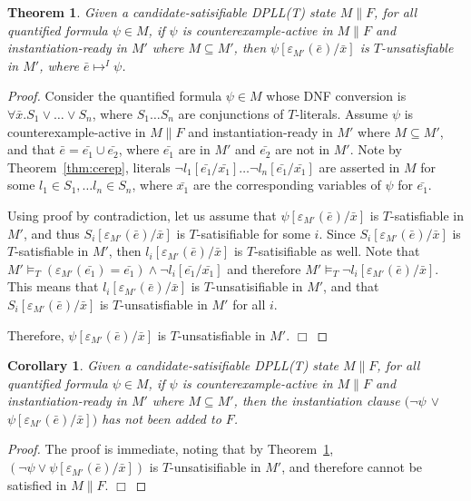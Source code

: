 \documentclass{llncs}
\newtheorem{thm}{Theorem}
\newtheorem{cor}{Corollary}
\begin{document}
\begin{thm}
\label{thm:instready}
Given a candidate-satisifiable DPLL(T) state $M \parallel F$, for all quantified formula $\psi \in M$, if $\psi$ is counterexample-active in $M \parallel F$ and instantiation-ready in $M'$ where $M \subseteq M'$, then $\psi[\varepsilon_{M'}( \bar{e} )/\bar{x}]$ is $T$-unsatisfiable in $M'$, where $\bar{e} \mapsto^I \psi$.
\end{thm}
\begin{proof}
Consider the quantified formula $\psi \in M$ whose DNF conversion is $\forall \bar{x}. S_1 \vee \ldots \vee S_n$, where $S_1 \ldots S_n$ are conjunctions of $T$-literals.
Assume $\psi$ is counterexample-active in $M \parallel F$ and instantiation-ready in $M'$ where $M \subseteq M'$, and that $\bar{e} = \bar{e_1} \cup \bar{e_2}$, where $\bar{e_1}$ are in $M'$ and $\bar{e_2}$ are not in $M'$.
Note by Theorem~\ref{thm:cerep}, literals $\neg l_1 [\bar{e_1}/\bar{x_1}] \ldots \neg l_n [ \bar{e_1}/\bar{x_1} ]$ are asserted in $M$ for some $l_1 \in S_1, \ldots l_n \in S_n$, where $\bar{x_1}$ are the corresponding variables of $\psi$ for $\bar{e_1}$.

Using proof by contradiction, let us assume that $\psi[\varepsilon_{M'}( \bar{e} )/\bar{x}]$ is $T$-satisfiable in $M'$, and thus $S_i[\varepsilon_{M'}( \bar{e} )/\bar{x}]$ is $T$-satisifiable for some $i$.
Since $S_i[\varepsilon_{M'}(\bar{e})/\bar{x}]$ is $T$-satisfiable in $M'$, then $l_i[\varepsilon_{M'}( \bar{e} )/\bar{x}]$ is $T$-satisifiable as well.
Note that $M' \models_T (\varepsilon_{M'}(\bar{e_1}) = \bar{e_1}) \wedge \neg l_i[\bar{e_1}/\bar{x_1}]$ and therefore $M' \models_T \neg l_i[\varepsilon_{M'}(\bar{e})/\bar{x}]$.
This means that $l_i[\varepsilon_{M'}(\bar{e})/\bar{x}]$ is $T$-unsatisifiable in $M'$, and that $S_i[\varepsilon_{M'}(\bar{e})/\bar{x}]$ is $T$-unsatisfiable in $M'$ for all $i$.

Therefore, $\psi[\varepsilon_{M'}( \bar{e} )/\bar{x}]$ is $T$-unsatisfiable in $M'$. $\Box$
\end{proof}

\begin{cor}
\label{cor:instready}
Given a candidate-satisifiable DPLL(T) state $M \parallel F$, for all quantified formula $\psi \in M$,
if $\psi$ is counterexample-active in $M \parallel F$ and instantiation-ready in $M'$ where $M \subseteq M'$, then the instantiation clause $( \neg \psi$ $\vee$ $\psi[\varepsilon_{M'}( \bar{e} )/\bar{x}])$ has not been added to $F$.
\end{cor}
\begin{proof}
The proof is immediate, noting that by Theorem~\ref{thm:instready}, $( \neg \psi \vee \psi[\varepsilon_{M'}( \bar{e} )/\bar{x}])$ is $T$-unsatisifiable in $M'$, and therefore cannot be satisfied in $M \parallel F$. $\Box$
\end{proof}
\end{document}
